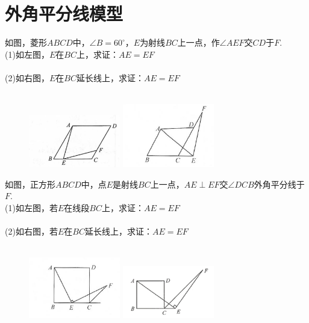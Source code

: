 \documentclass{ecnuthesis}
\begin{document}
\section{外角平分线模型}
\begin{example}
    如图，菱形$ABCD$中，$\angle B=60^\circ$，$E$为射线$BC$上一点，作$\angle AEF$交$CD$于$F$. \\
    (1)如左图，$E$在$BC$上，求证：$AE=EF$ \\
    \\
    (2)如右图，$E$在$BC$延长线上，求证：$AE=EF$ \\
    \\
\end{example}
\begin{figure}[H]
\begin{minipage}{0.48\linewidth}
\includegraphics[width=4cm]{picture/616.png}
\end{minipage}
\begin{minipage}{0.48\linewidth}
\includegraphics[width=4cm]{picture/617.png}
\end{minipage}
\end{figure}
\begin{example}
    如图，正方形$ABCD$中，点$E$是射线$BC$上一点，$AE\perp EF$交$\angle DCB$外角平分线于$F$. \\
    (1)如左图，若$E$在线段$BC$上，求证：$AE=EF$ \\
    \\
    (2)如右图，若$E$在$BC$延长线上，求证：$AE=EF$ \\
    \\
\end{example}
\begin{figure}[H]
\begin{minipage}{0.48\linewidth}
\includegraphics[width=4cm]{picture/651.png}
\end{minipage}
\begin{minipage}{0.48\linewidth}
\includegraphics[width=4cm]{picture/618.png}
\end{minipage}
\end{figure}
\end{document}
